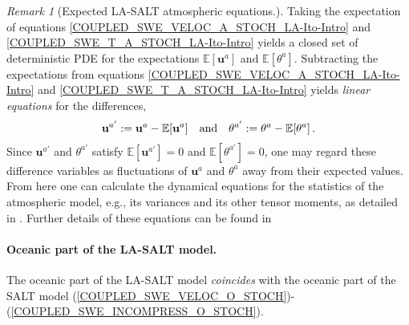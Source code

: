 \documentclass[11pt, oneside]{article}   	%
\numberwithin{equation}{section}
\theoremstyle{plain}
\theoremstyle{definition}
\theoremstyle{remark}
\newtheorem{remark}[theorem]{Remark}
\newcommand{\<}{\langle}
\renewcommand{\>}{\rangle}
\begin{document}
\begin{remark}[Expected LA-SALT atmospheric equations.]
Taking the expectation of equations \eqref{COUPLED_SWE_VELOC_A_STOCH_LA-Ito-Intro} and  \eqref{COUPLED_SWE_T_A_STOCH_LA-Ito-Intro} yields a closed set of deterministic PDE for the expectations 
$\mathbb{E}[{\mathbf{u}}^{a}]$ and $\mathbb{E}[\theta ^{a}]$. Subtracting the expectations from equations \eqref{COUPLED_SWE_VELOC_A_STOCH_LA-Ito-Intro} and  \eqref{COUPLED_SWE_T_A_STOCH_LA-Ito-Intro} yields \emph{linear equations} for the differences,   
\begin{align}
{\mathbf{u}}^{a'}:= {\mathbf{u}}^{a} - \mathbb{E}[{\mathbf{u}}^{a}]
\quad\hbox{and}\quad
\theta ^{a'} := \theta ^{a} - \mathbb{E}[\theta ^{a}]
\,.
\label{fluctuations_u_theta}
\end{align}
Since ${\mathbf{u}}^{a'}$ and $\theta ^{a'}$ satisfy $\mathbb{E}[{\mathbf{u}}^{a'}]=0$ and $\mathbb{E}[\theta ^{a'}]=0$, one may regard these difference variables as fluctuations of ${\mathbf{u}}^{a}$ and $\theta ^{a}$ away from their expected values. From here one can calculate the dynamical equations for the statistics of the atmospheric model, e.g., its variances and its other tensor moments, as detailed in \cite{DrivasHolm2019,DrivasHolmLeahy2020,alonso2020modelling}. Further details of these equations can be found in  \cite{crisan2023implementation,sharma2026structure}
\end{remark}

\paragraph{Oceanic part of the LA-SALT model.}
The oceanic part of the LA-SALT model \emph{coincides} with the oceanic part of the SALT model (\ref{COUPLED_SWE_VELOC_O_STOCH})-(\ref{COUPLED_SWE_INCOMPRESS_O_STOCH}).

\end{document}
